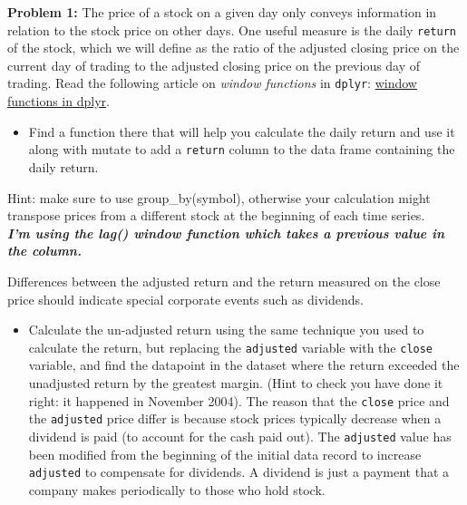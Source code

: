 \documentclass[
  letterpaper,
  DIV=11,
  numbers=noendperiod]{scrartcl}
\providecommand{\tightlist}{%
  \setlength{\itemsep}{0pt}\setlength{\parskip}{0pt}}\usepackage{longtable,booktabs,array}
\begin{document}
\textbf{Problem 1:} The price of a stock on a given day only conveys
information in relation to the stock price on other days. One useful
measure is the daily \texttt{return} of the stock, which we will define
as the ratio of the adjusted closing price on the current day of trading
to the adjusted closing price on the previous day of trading. Read the
following article on \emph{window functions} in \texttt{dplyr}:
\href{https://dplyr.tidyverse.org/articles/window-functions.html}{window
functions in dplyr}.

\begin{itemize}
\tightlist
\item
  Find a function there that will help you calculate the daily return
  and use it along with mutate to add a \texttt{return} column to the
  data frame containing the daily return.
\end{itemize}

Hint: make sure to use group\_by(symbol), otherwise your calculation
might transpose prices from a different stock at the beginning of each
time series.\\
\textbf{\emph{\hfill\break
\hfill\break
I'm using the lag() window function which takes a previous value in the
column.}}

Differences between the adjusted return and the return measured on the
close price should indicate special corporate events such as dividends.

\begin{itemize}
\tightlist
\item
  Calculate the un-adjusted return using the same technique you used to
  calculate the return, but replacing the \texttt{adjusted} variable
  with the \texttt{close} variable, and find the datapoint in the
  dataset where the return exceeded the unadjusted return by the
  greatest margin. (Hint to check you have done it right: it happened in
  November 2004). The reason that the \texttt{close} price and the
  \texttt{adjusted} price differ is because stock prices typically
  decrease when a dividend is paid (to account for the cash paid out).
  The \texttt{adjusted} value has been modified from the beginning of
  the initial data record to increase \texttt{adjusted} to compensate
  for dividends. A dividend is just a payment that a company makes
  periodically to those who hold stock.
\end{itemize}
\end{document}
